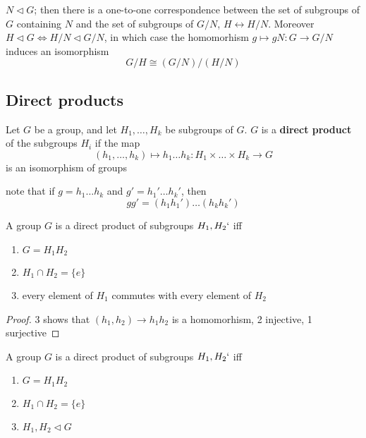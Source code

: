 \documentclass[11pt]{article}
\begin{document}
\begin{corollary}[]
\(N\lhd G\); then there is a one-to-one correspondence between the set of subgroups of \(G\)
containing \(N\) and the set of subgroups of \(G/N\), \(H\leftrightarrow H/N\).
Moreover \(H\lhd G\Leftrightarrow H/N\lhd G/N\), in which case the homomorhism \(g\mapsto gN:G\to G/N\) induces an
isomorphism
\begin{equation*}
G/H\cong(G/N)/(H/N)
\end{equation*}
\end{corollary}
\subsection{Direct products}
\label{sec:orgcee371d}
Let \(G\) be a group, and let \(H_1,\dots,H_k\) be subgroups of \(G\). \(G\) is a \textbf{direct product} of
the subgroups \(H_i\) if the map
\begin{equation*}
(h_1,\dots,h_k)\mapsto h_1\dots h_k:H_1\times\dots\times H_k\to G
\end{equation*}
is an isomorphism of groups

note that if \(g=h_1\dots h_k\) and \(g'=h_1'\dots h_k'\), then
\begin{equation*}
gg'=(h_1h_1')\dots(h_kh_k')
\end{equation*}

\begin{proposition}[]
A group \(G\) is a direct product of subgroups \(H_1,H_2`\) iff
\begin{enumerate}
\item \(G=H_1H_2\)
\item \(H_1\cap H_2=\{e\}\)
\item every element of \(H_1\) commutes with every element of \(H_2\)
\end{enumerate}
\end{proposition}

\begin{proof}
3 shows that \((h_1,h_2)\to h_1h_2\) is a homomorhism, 2 injective, 1 surjective
\end{proof}

\begin{proposition}[]
A group \(G\) is a direct product of subgroups \(H_1,H_2`\) iff
\begin{enumerate}
\item \(G=H_1H_2\)
\item \(H_1\cap H_2=\{e\}\)
\item \(H_1,H_2\lhd G\)
\end{enumerate}
\end{proposition}
\end{document}
